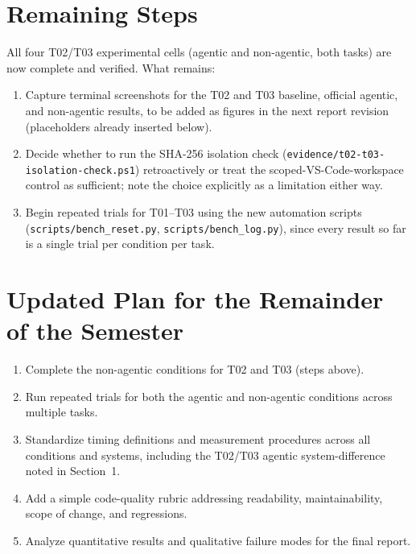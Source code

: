 \documentclass[12pt]{article}
\begin{document}
\section{Remaining Steps}

All four T02/T03 experimental cells (agentic and non-agentic, both tasks) are
now complete and verified. What remains:

\begin{enumerate}
    \item Capture terminal screenshots for the T02 and T03 baseline, official
    agentic, and non-agentic results, to be added as figures in the next
    report revision (placeholders already inserted below).
    \item Decide whether to run the SHA-256 isolation check
    (\small\texttt{evidence/t02-t03-isolation-check.ps1}\normalsize)
    retroactively or treat the scoped-VS-Code-workspace control as
    sufficient; note the choice explicitly as a limitation either way.
    \item Begin repeated trials for T01--T03 using the new automation
    scripts (\texttt{scripts/bench\_reset.py}, \texttt{scripts/bench\_log.py}),
    since every result so far is a single trial per condition per task.
\end{enumerate}

\section{Updated Plan for the Remainder of the Semester}

\begin{enumerate}
    \item Complete the non-agentic conditions for T02 and T03 (steps above).
    \item Run repeated trials for both the agentic and non-agentic conditions
    across multiple tasks.
    \item Standardize timing definitions and measurement procedures across all
    conditions and systems, including the T02/T03 agentic system-difference
    noted in Section~1.
    \item Add a simple code-quality rubric addressing readability,
    maintainability, scope of change, and regressions.
    \item Analyze quantitative results and qualitative failure modes for the
    final report.
\end{enumerate}
\end{document}
